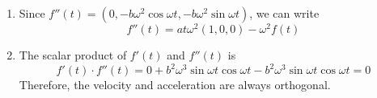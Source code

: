 \documentclass{report}
\begin{document}
\begin{enumerate}
\begin{enumerate}
		\item 
		Since 
		$f''(t) = (0, -b\omega^2\cos\omega t, -b\omega^2\sin\omega t)$, 
		we can write
		\[f''(t) = at\omega^2(1,0,0)-\omega^2f(t)\]

		\item The scalar product of $f'(t)$ and $f''(t)$ is 
		\[
			f'(t) \cdot f''(t) =
			0 +
			b^2\omega^3\sin\omega t \cos\omega t - 
			b^2\omega^3\sin\omega t \cos\omega t
			= 0
		\]
		Therefore, the velocity and acceleration are always orthogonal.
	\end{enumerate}
\end{enumerate}
\end{document}
